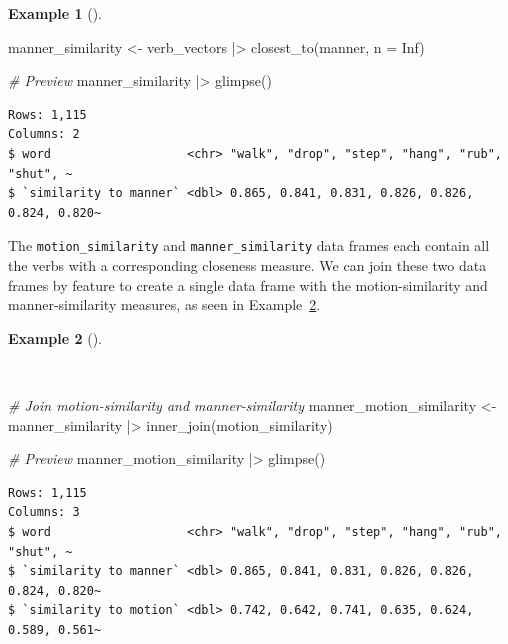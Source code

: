 \documentclass[
  letterpaper,
  krantz1]{latex/krantz-mod}
\newenvironment{Shaded}{\begin{snugshade}}{\end{snugshade}}
\newcommand{\AttributeTok}[1]{\textcolor[rgb]{0.00,0.00,0.00}{#1}}
\newcommand{\CommentTok}[1]{\textcolor[rgb]{0.00,0.00,0.00}{\textit{#1}}}
\newcommand{\ConstantTok}[1]{\textcolor[rgb]{0.00,0.00,0.00}{#1}}
\newcommand{\FunctionTok}[1]{\textcolor[rgb]{0.00,0.00,0.00}{#1}}
\newcommand{\NormalTok}[1]{\textcolor[rgb]{0.00,0.00,0.00}{#1}}
\newcommand{\OtherTok}[1]{\textcolor[rgb]{0.00,0.00,0.00}{#1}}
\newcommand{\SpecialCharTok}[1]{\textcolor[rgb]{0.00,0.00,0.00}{#1}}
\theoremstyle{definition}
\newtheorem{example}{Example}[chapter]
\theoremstyle{definition}
\theoremstyle{remark}
\begin{document}
\begin{example}[]
\begin{Shaded}
\begin{Highlighting}[numbers=left,,]
\NormalTok{manner\_similarity }\OtherTok{\textless{}{-}}
\NormalTok{  verb\_vectors }\SpecialCharTok{|\textgreater{}} \FunctionTok{closest\_to}\NormalTok{(manner, }\AttributeTok{n =} \ConstantTok{Inf}\NormalTok{)}

\CommentTok{\# Preview}
\NormalTok{manner\_similarity }\SpecialCharTok{|\textgreater{}} \FunctionTok{glimpse}\NormalTok{()}
\end{Highlighting}
\end{Shaded}

\begin{verbatim}
Rows: 1,115
Columns: 2
$ word                   <chr> "walk", "drop", "step", "hang", "rub", "shut", ~
$ `similarity to manner` <dbl> 0.865, 0.841, 0.831, 0.826, 0.826, 0.824, 0.820~
\end{verbatim}

\end{example}

The \texttt{motion\_similarity} and \texttt{manner\_similarity} data
frames each contain all the verbs with a corresponding closeness
measure. We can join these two data frames by feature to create a single
data frame with the motion-similarity and manner-similarity measures, as
seen in Example~\ref{exm-explore-masc-vsm-word2vec-manner-motion}.

\begin{example}[]\protect\hypertarget{exm-explore-masc-vsm-word2vec-manner-motion}{}\label{exm-explore-masc-vsm-word2vec-manner-motion}

~

\begin{Shaded}
\begin{Highlighting}[numbers=left,,]
\CommentTok{\# Join motion{-}similarity and manner{-}similarity}
\NormalTok{manner\_motion\_similarity }\OtherTok{\textless{}{-}}
\NormalTok{  manner\_similarity }\SpecialCharTok{|\textgreater{}}
  \FunctionTok{inner\_join}\NormalTok{(motion\_similarity)}

\CommentTok{\# Preview}
\NormalTok{manner\_motion\_similarity }\SpecialCharTok{|\textgreater{}} \FunctionTok{glimpse}\NormalTok{()}
\end{Highlighting}
\end{Shaded}

\begin{verbatim}
Rows: 1,115
Columns: 3
$ word                   <chr> "walk", "drop", "step", "hang", "rub", "shut", ~
$ `similarity to manner` <dbl> 0.865, 0.841, 0.831, 0.826, 0.826, 0.824, 0.820~
$ `similarity to motion` <dbl> 0.742, 0.642, 0.741, 0.635, 0.624, 0.589, 0.561~
\end{verbatim}

\end{example}
\end{document}
